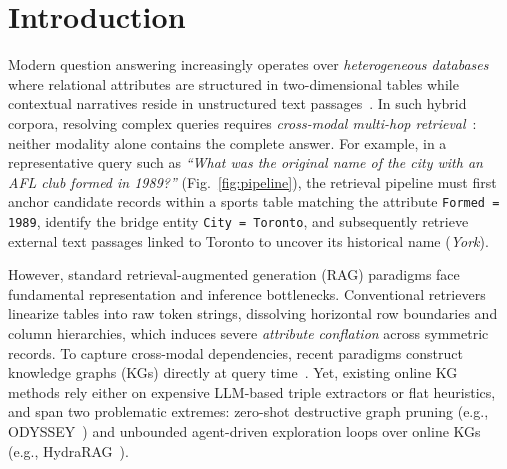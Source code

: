 \documentclass[runningheads]{llncs}
\begin{document}
\makeatletter
{}
\makeatother
\section{Introduction}
\makeatletter
{}
\makeatother

Modern question answering increasingly operates over \emph{heterogeneous databases} where relational attributes are structured in two-dimensional tables while contextual narratives reside in unstructured text passages~\cite{zhou2026tableqasurvey}. In such hybrid corpora, resolving complex queries requires \emph{cross-modal multi-hop retrieval}~\cite{hybridqa}: neither modality alone contains the complete answer. For example, in a representative query such as \emph{``What was the original name of the city with an AFL club formed in 1989?''} (Fig.~\ref{fig:pipeline}), the retrieval pipeline must first anchor candidate records within a sports table matching the attribute \texttt{Formed = 1989}, identify the bridge entity \texttt{City = Toronto}, and subsequently retrieve external text passages linked to Toronto to uncover its historical name (\emph{York}).

However, standard retrieval-augmented generation (RAG) paradigms face fundamental representation and inference bottlenecks. Conventional retrievers linearize tables into raw token strings, dissolving horizontal row boundaries and column hierarchies, which induces severe \emph{attribute conflation} across symmetric records. To capture cross-modal dependencies, recent paradigms construct knowledge graphs (KGs) directly at query time~\cite{agarwal2025hybrid,peng2024graphragsurvey}. Yet, existing online KG methods rely either on expensive LLM-based triple extractors or flat heuristics, and span two problematic extremes: zero-shot destructive graph pruning (e.g., ODYSSEY~\cite{agarwal2025hybrid}) and unbounded agent-driven exploration loops over online KGs (e.g., HydraRAG~\cite{tan2025hydrarag}).
\end{document}
